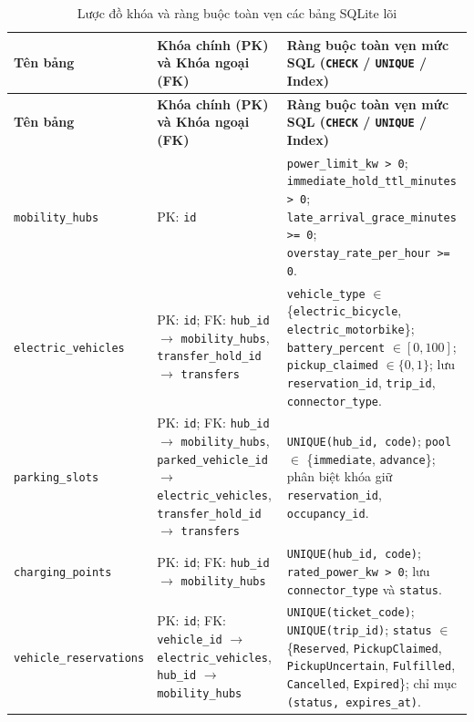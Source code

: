 \begin{longtable}{>{\raggedright\arraybackslash\small}p{3.6cm} >{\raggedright\arraybackslash\small}p{4.3cm} >{\raggedright\arraybackslash}p{6.4cm}}
\caption{Lược đồ khóa và ràng buộc toàn vẹn các bảng SQLite lõi} \label{tab:sqlite-core-tables} \\
\toprule
\textbf{Tên bảng} & \textbf{Khóa chính (PK) và Khóa ngoại (FK)} & \textbf{Ràng buộc toàn vẹn mức SQL (\texttt{CHECK} / \texttt{UNIQUE} / Index)} \\
\midrule
\endfirsthead
\toprule
\textbf{Tên bảng} & \textbf{Khóa chính (PK) và Khóa ngoại (FK)} & \textbf{Ràng buộc toàn vẹn mức SQL (\texttt{CHECK} / \texttt{UNIQUE} / Index)} \\
\midrule
\endhead
\bottomrule
\endfoot
\texttt{mobility\_hubs} & PK: \texttt{id} & \texttt{power\_limit\_kw > 0}; \texttt{immediate\_hold\_ttl\_minutes > 0}; \texttt{late\_arrival\_grace\_minutes >= 0}; \texttt{overstay\_rate\_per\_hour >= 0}. \\
\midrule
\texttt{electric\_vehicles} & PK: \texttt{id}; FK: \texttt{hub\_id} $\to$ \texttt{mobility\_hubs}, \texttt{transfer\_hold\_id} $\to$ \texttt{transfers} & \texttt{vehicle\_type} $\in$ \{\texttt{electric\_bicycle}, \texttt{electric\_motorbike}\}; \texttt{battery\_percent} $\in [0, 100]$; \texttt{pickup\_claimed} $\in \{0, 1\}$; lưu \texttt{reservation\_id}, \texttt{trip\_id}, \texttt{connector\_type}. \\
\midrule
\texttt{parking\_slots} & PK: \texttt{id}; FK: \texttt{hub\_id} $\to$ \texttt{mobility\_hubs}, \texttt{parked\_vehicle\_id} $\to$ \texttt{electric\_vehicles}, \texttt{transfer\_hold\_id} $\to$ \texttt{transfers} & \texttt{UNIQUE(hub\_id, code)}; \texttt{pool} $\in$ \{\texttt{immediate}, \texttt{advance}\}; phân biệt khóa giữ \texttt{reservation\_id}, \texttt{occupancy\_id}. \\
\midrule
\texttt{charging\_points} & PK: \texttt{id}; FK: \texttt{hub\_id} $\to$ \texttt{mobility\_hubs} & \texttt{UNIQUE(hub\_id, code)}; \texttt{rated\_power\_kw > 0}; lưu \texttt{connector\_type} và \texttt{status}. \\
\midrule
\texttt{vehicle\_\allowbreak reservations} & PK: \texttt{id}; FK: \texttt{vehicle\_id} $\to$ \texttt{electric\_vehicles}, \texttt{hub\_id} $\to$ \texttt{mobility\_hubs} & \texttt{UNIQUE(ticket\_code)}; \texttt{UNIQUE(trip\_id)}; \texttt{status} $\in$ \{\texttt{Reserved}, \texttt{PickupClaimed}, \texttt{PickupUncertain}, \texttt{Fulfilled}, \texttt{Cancelled}, \texttt{Expired}\}; chỉ mục \texttt{(status, expires\_at)}. \\

\end{longtable}

